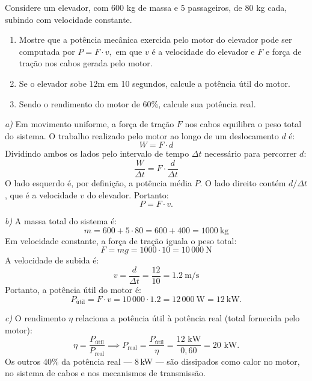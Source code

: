 \begin{exemplo}[Nível II]\label{exemplo_energia_potenciaex02}

Considere um elevador, com 600 kg de massa e 5 passageiros, de 80 kg cada, subindo com velocidade constante.

\begin{enumerate}
    \item [a)] Mostre que a potência mecânica exercida pelo motor do elevador pode ser computada por $P=F\cdot v,$ em que $v$ é a velocidade do elevador e $F$ e força de tração nos cabos gerada pelo motor.

    \item [b)] Se o elevador sobe $12$m em 10 segundos, calcule a potência útil do motor.

    \item [c)] Sendo o rendimento do motor de 60\%, calcule sua potência real.
\end{enumerate}



\resolucao



\noindent\textit{a)} Em movimento uniforme, a força de tração $F$ nos cabos
equilibra o peso total do sistema. O trabalho realizado pelo motor ao longo
de um deslocamento $d$ é:
\[
    W = F \cdot d
\]
Dividindo ambos os lados pelo intervalo de tempo $\Delta t$ necessário para
percorrer $d$:
\[
    \frac{W}{\Delta t} = F \cdot \frac{d}{\Delta t}
\]
O lado esquerdo é, por definição, a potência média $P$. O lado direito contém
$d/\Delta t$, que é a velocidade $v$ do elevador. Portanto:
\[
    \boxed{P = F \cdot v.}
\]

\medskip
\noindent\textit{b)} A massa total do sistema é:
\[
    m = 600 + 5 \cdot 80 = 600 + 400 = 1000\ \text{kg}
\]
Em velocidade constante, a força de tração iguala o peso total:
\[
    F = mg = 1000 \cdot 10 = 10\,000\ \text{N}
\]
A velocidade de subida é:
\[
    v = \frac{d}{\Delta t} = \frac{12}{10} = 1.2\ \text{m/s}
\]
Portanto, a potência útil do motor é:
\[
    P_{\text{útil}} = F \cdot v = 10\,000 \cdot 1.2 = 12\,000\ \text{W}
    = 12\ \text{kW}.
\]

\medskip
\noindent\textit{c)} O rendimento $\eta$ relaciona a potência útil à potência real
(total fornecida pelo motor):
\[
    \eta = \frac{P_{\text{útil}}}{P_{\text{real}}}
    \implies
    P_{\text{real}} = \frac{P_{\text{útil}}}{\eta}
    = \frac{12 \text{ kW}}{0{,}60}
   = 20 \text{ kW}.
\]
Os outros 40\% da potência real — 8\,kW — são dissipados como
calor no motor, no sistema de cabos e nos mecanismos de transmissão.



\end{exemplo}
\vspace{0.3cm}





